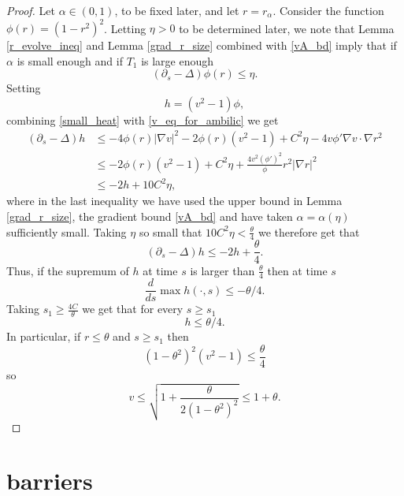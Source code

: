 \documentclass[leqno,11pt]{amsart}
\theoremstyle{definition}
\begin{document}
\begin{proof}
Let $\alpha\in (0,1)$, to be fixed later, and let $r=r_{\alpha}$. Consider the function $\phi(r)=(1-r^2)^2$. Letting $\eta>0$ { to be determined later}, we note that  Lemma \ref{r_evolve_ineq} and Lemma \ref{grad_r_size} combined with \eqref{vA_bd} imply that if $\alpha$ is small enough and if $T_1$ is large enough
\begin{equation}\label{small_heat}
(\partial_s-\Delta)\phi(r) \leq  \eta.
\end{equation}
{
Setting 
\[
h=(v^2-1)\phi,
\]
combining \eqref{small_heat}  with \eqref{v_eq_for_ambilic} }we get
\begin{align}\label{first_evol_local2}
(\partial_s-\Delta)h &\leq -4\phi(r)|\nabla v|^2-2\phi(r) (v^2-1)+C^2\eta-4v\phi' \nabla v\cdot \nabla r^2 \nonumber\\
&\leq -2\phi(r) (v^2-1)+C^2\eta+\frac{4v^2(\phi')^2}{\phi}r^2|\nabla r|^2\\
& \leq -2h+10C^2 \eta\nonumber, 
\end{align}
where in the last inequality we have used the upper bound in Lemma \ref{grad_r_size}, the gradient bound \eqref{vA_bd} and have taken $\alpha=\alpha(\eta)$  sufficiently small. Taking $\eta$ so small that $10C^2\eta<\frac{\theta}{4}$ we therefore get that
\begin{equation}
(\partial_s-\Delta)h \leq -2h+\frac{\theta}{4}.
\end{equation}
Thus, if the supremum of $h$ at time $s$ is larger than $\frac{\theta}{4}$ then  at time $s$ 
\begin{equation}
\frac{d}{ds}\max h(\cdot,s) \leq -\theta/4. 
\end{equation}
Taking $s_1\geq \frac{4C}{\theta}$ we get that for every $s\geq s_1$
\begin{equation}
h \leq \theta/4. 
\end{equation}
In particular, if $r\leq \theta$ and $s \geq s_1$ then 
\begin{equation}
(1-\theta^2)^2(v^2-1) \leq \frac{\theta}{4}
\end{equation}
so
\begin{equation}
v \leq \sqrt{1+ \frac{\theta}{2(1-\theta^2)^2}} \leq 1+\theta.  
\end{equation}


\end{proof}



\section{barriers}
\end{document}
